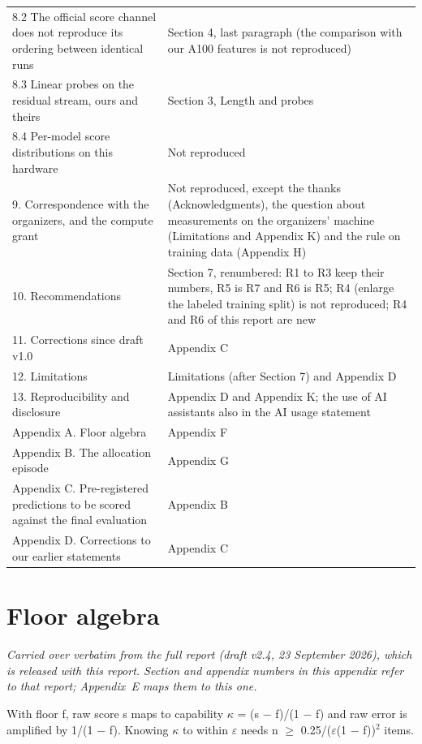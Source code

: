 \begin{center}
\begin{tabular}{L{7.4cm}L{5.8cm}}
8.2 The official score channel does not reproduce its ordering between identical runs & Section 4, last paragraph (the comparison with our A100 features is not reproduced) \\
8.3 Linear probes on the residual stream, ours and theirs & Section 3, Length and probes \\
8.4 Per-model score distributions on this hardware & Not reproduced \\
9. Correspondence with the organizers, and the compute grant & Not reproduced, except the thanks (Acknowledgments), the question about measurements on the organizers' machine (Limitations and Appendix K) and the rule on training data (Appendix H) \\
10. Recommendations & Section 7, renumbered: R1 to R3 keep their numbers, R5 is R7 and R6 is R5; R4 (enlarge the labeled training split) is not reproduced; R4 and R6 of this report are new \\
11. Corrections since draft v1.0 & Appendix C \\
12. Limitations & Limitations (after Section 7) and Appendix D \\
13. Reproducibility and disclosure & Appendix D and Appendix K; the use of AI assistants also in the AI usage statement \\
Appendix A. Floor algebra & Appendix F \\
Appendix B. The allocation episode & Appendix G \\
Appendix C. Pre-registered predictions to be scored against the final evaluation & Appendix B \\
Appendix D. Corrections to our earlier statements & Appendix C \\
\bottomrule
\end{tabular}
\end{center}

\section{Floor algebra}\label{app:F}
\emph{Carried over verbatim from the full report (draft v2.4, 23 September 2026), which is released with this report. Section and appendix numbers in this appendix refer to that report; Appendix~E maps them to this one.}

With floor f, raw score s maps to capability $\kappa$ = (s $-$ f)/(1 $-$ f) and raw error is amplified by 1/(1 $-$ f). Knowing $\kappa$ to within $\varepsilon$ needs n $\geq$ 0.25/($\varepsilon$(1 $-$ f))$^2$ items.

